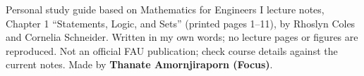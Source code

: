 \documentclass[11pt]{article}
\begin{document}
\vfill{\small Personal study guide based on Mathematics for Engineers I lecture notes, Chapter 1 “Statements, Logic, and Sets” (printed pages 1–11), by Rhoslyn Coles and Cornelia Schneider. Written in my own words; no lecture pages or figures are reproduced. Not an official FAU publication; check course details against the current notes. Made by \textbf{Thanate Amornjiraporn (Focus)}.}
\end{document}

